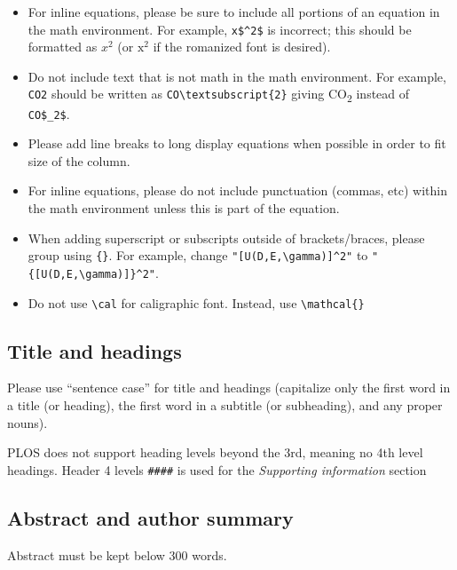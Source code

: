 \documentclass[
  10pt,
  letterpaper,
]{article}
\begin{document}
\begin{itemize}
\item
  For inline equations, please be sure to include all portions of an
  equation in the math environment. For example, \texttt{x\$\^{}2\$} is
  incorrect; this should be formatted as \(x^2\) (or \(\mathrm{x}^2\) if
  the romanized font is desired).
\item
  Do not include text that is not math in the math environment. For
  example, \texttt{CO2} should be written as
  \texttt{CO\textbackslash{}textsubscript\{2\}} giving
  CO\textsubscript{2} instead of \texttt{CO\$\_2\$}.
\item
  Please add line breaks to long display equations when possible in
  order to fit size of the column.
\item
  For inline equations, please do not include punctuation (commas, etc)
  within the math environment unless this is part of the equation.
\item
  When adding superscript or subscripts outside of brackets/braces,
  please group using \texttt{\{\}}. For example, change
  \texttt{"{[}U(D,E,\textbackslash{}gamma){]}\^{}2"} to
  \texttt{"\{{[}U(D,E,\textbackslash{}gamma){]}\}\^{}2"}.\\
\item
  Do not use \texttt{\textbackslash{}cal} for caligraphic font. Instead,
  use \texttt{\textbackslash{}mathcal\{\}}
\end{itemize}

\hypertarget{title-and-headings}{%
\subsection{Title and headings}\label{title-and-headings}}

Please use ``sentence case'' for title and headings (capitalize only the
first word in a title (or heading), the first word in a subtitle (or
subheading), and any proper nouns).

PLOS does not support heading levels beyond the 3rd, meaning no 4th
level headings. Header 4 levels \texttt{\#\#\#\#} is used for the
\emph{Supporting information} section

\hypertarget{abstract-and-author-summary}{%
\subsection{Abstract and author
summary}\label{abstract-and-author-summary}}

Abstract must be kept below 300 words.
\end{document}
